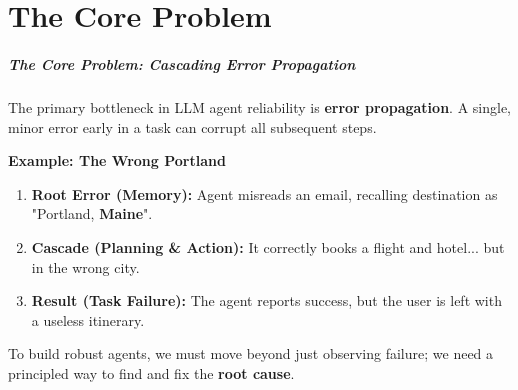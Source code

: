 \documentclass[10pt]{beamer}
\begin{document}
\part{The Core Problem}

\begin{frame}
  \frametitle{The Core Problem: Cascading Error Propagation}
  The primary bottleneck in LLM agent reliability is \textbf{error propagation}. A single, minor error early in a task can corrupt all subsequent steps.
  
  \begin{center}
  \end{center}

  \textbf{Example: The Wrong Portland}
  \begin{enumerate}
    \item \textbf{Root Error (Memory):} Agent misreads an email, recalling destination as "Portland, \textbf{Maine}".
    \item \textbf{Cascade (Planning \& Action):} It correctly books a flight and hotel... but in the wrong city.
    \item \textbf{Result (Task Failure):} The agent reports success, but the user is left with a useless itinerary.
  \end{enumerate}
  
  To build robust agents, we must move beyond just observing failure; we need a principled way to find and fix the \textbf{root cause}.
\end{frame}
\end{document}
